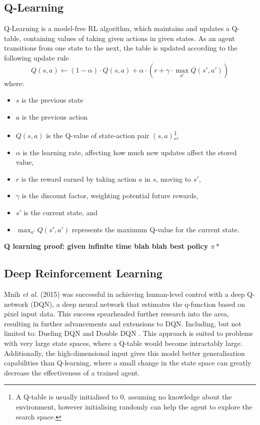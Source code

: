\subsection{Q-Learning}
Q-Learning \cite{watkins1992q} is a model-free RL algorithm, which maintains and updates a Q-table, containing values of taking given actions in given states. As an agent transitions from one state to the next, the table is updated according to the following update rule
\[
Q(s, a) \leftarrow (1 - \alpha) \cdot Q(s, a) + \alpha \cdot \left( r + \gamma \cdot \max_{a'} Q(s', a') \right)
\]
where:
\begin{itemize}
    \item $s$ is the previous state
    \item $a$ is the previous action
    \item $Q(s, a)$ is the Q-value of state-action pair $(s, a)$\footnote{A Q-table is usually initialised to 0, assuming no knowledge about the environment, however initialising randomly can help the agent to explore the search space.},
    \item $\alpha$ is the learning rate, affecting how much new updates affect the stored value,
    \item $r$ is the reward earned by taking action $a$ in $s$, moving to $s'$,
    \item $\gamma$ is the discount factor, weighting potential future rewards,
    \item $s'$ is the current state, and
    \item $\max_{a'} Q(s', a')$ represents the maximum Q-value for the current state.
\end{itemize}
\textbf{Q learning proof: given infinite time blah blah best policy $\pi*$}
\subsection{Deep Reinforcement Learning}
Mnih \textit{et al.} (2015) \cite{mnih2015human} was successful in achieving human-level control with a deep Q-network (DQN), a deep neural network that estimates the q-function based on pixel input data. This success spearheaded further research into the area, resulting in further advancements and extensions to DQN. Including, but not limited to: Dueling DQN \cite{wang2016dueling} and Double DQN \cite{van2016doubleq}. This approach is suited to problems with very large state spaces, where a Q-table would become intractably large. Additionally, the high-dimensional input gives this model better generalisation capabilities than Q-learning, where a small change in the state space can greatly decrease the effectiveness of a trained agent.